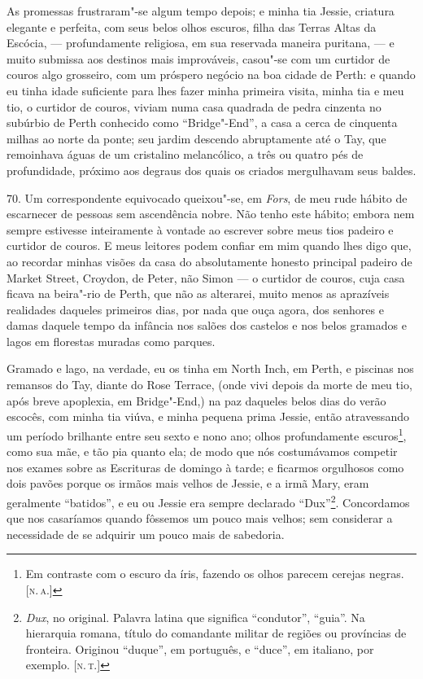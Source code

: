 As promessas frustraram"-se algum tempo depois; e minha tia Jessie,
criatura elegante e perfeita, com seus belos olhos escuros, filha das
Terras Altas da Escócia, --- profundamente religiosa, em sua reservada
maneira puritana, --- e muito submissa aos destinos mais improváveis,
casou"-se com um curtidor de couros algo grosseiro, com um próspero
negócio na boa cidade de Perth: e quando eu tinha idade suficiente para
lhes fazer minha primeira visita, minha tia e meu tio, o curtidor de
couros, viviam numa casa quadrada de pedra cinzenta no subúrbio de Perth
conhecido como ``Bridge"-End'', a casa a cerca de cinquenta milhas ao
norte da ponte; seu jardim descendo abruptamente até o Tay, que
remoinhava águas de um cristalino melancólico, a três ou quatro pés de
profundidade, próximo aos degraus dos quais os criados mergulhavam seus
baldes.

70. Um correspondente equivocado queixou"-se, em \emph{Fors}, de meu rude
hábito de escarnecer de pessoas sem ascendência nobre. Não tenho este
hábito; embora nem sempre estivesse inteiramente à vontade ao escrever
sobre meus tios padeiro e curtidor de couros. E meus leitores podem
confiar em mim quando lhes digo que, ao recordar minhas visões da casa
do absolutamente honesto principal padeiro de Market Street, Croydon, de
Peter, não Simon --- o curtidor de couros, cuja casa ficava na beira"-rio
de Perth, que não as alterarei, muito menos as aprazíveis realidades
daqueles primeiros dias, por nada que ouça agora, dos senhores e damas
daquele tempo da infância nos salões dos castelos e nos belos gramados e
lagos em florestas muradas como parques.

Gramado e lago, na verdade, eu os tinha em North Inch, em Perth, e
piscinas nos remansos do Tay, diante do Rose Terrace, (onde vivi depois
da morte de meu tio, após breve apoplexia, em Bridge"-End,) na paz
daqueles belos dias do verão escocês, com minha tia viúva, e minha
pequena prima Jessie, então atravessando um período brilhante entre seu
sexto e nono ano; olhos profundamente escuros\footnote{Em contraste com
  o escuro da íris, fazendo os olhos parecem cerejas negras. {[}\textsc{n.\,a.}{]}}, como sua mãe, e tão pia quanto ela; de modo que nós
costumávamos competir nos exames sobre as Escrituras de domingo à tarde;
e ficarmos orgulhosos como dois pavões porque os irmãos mais velhos de
Jessie, e a irmã Mary, eram geralmente ``batidos'', e eu ou Jessie era
sempre declarado ``Dux''\footnote{\emph{Dux}, no original. Palavra
  latina que significa ``condutor'', ``guia''. Na hierarquia romana,
  título do comandante militar de regiões ou províncias de fronteira.
  Originou ``duque'', em português, e ``duce'', em italiano, por
  exemplo. {[}\textsc{n.\,t.}{]}}. Concordamos que nos casaríamos quando
fôssemos um pouco mais velhos; sem considerar a necessidade de se
adquirir um pouco mais de sabedoria.

